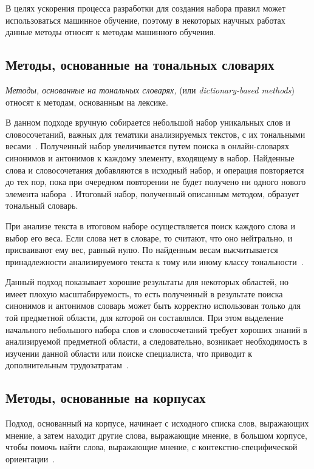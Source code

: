 В целях ускорения процесса разработки для создания набора правил может
использоваться машинное обучение, поэтому в некоторых научных работах
\cite{article16}~\cite{article17} данные методы относят к методам машинного
обучения.

\subsection{Методы, основанные на тональных словарях}

\textit{Методы, основанные на тональных словарях,} (или \textit{dictionary-based
methods}) относят к методам, основанным на лексике.

В данном подходе вручную собирается небольшой набор уникальных слов и
словосочетаний, важных для тематики анализируемых текстов, с их тональными
весами~\cite{article9}. Полученный набор увеличивается путем поиска в
онлайн-словарях синонимов и антонимов к каждому элементу, входящему в набор.
Найденные слова и словосочетания добавляются в исходный набор, и операция
повторяется до тех пор, пока при очередном повторении не будет получено
ни одного нового элемента набора~\cite{article4}. Итоговый набор,
полученный описанным методом, образует тональный словарь.

При анализе текста в итоговом наборе осуществляется поиск каждого слова и выбор
его веса. Если слова нет в словаре, то считают, что оно нейтрально, и
присваивают ему вес, равный нулю. По найденным весам высчитывается
принадлежности анализируемого текста к тому или иному классу
тональности~\cite{article9}.

Данный подход показывает хорошие результаты для некоторых областей, но
имеет плохую масштабируемость, то есть полученный в результате поиска
синонимов и антонимов словарь может быть корректно использован только для
той предметной области, для которой он составлялся. При этом выделение
начального небольшого набора слов и словосочетаний требует хороших
знаний в анализируемой предметной области, а следовательно, возникает
необходимость в изучении данной области или поиске специалиста, что приводит к
дополнительным трудозатратам~\cite{article9}.


\subsection{Методы, основанные на корпусах}

Подход, основанный на корпусе, начинает с исходного списка слов, выражающих
мнение, а затем находит другие слова, выражающие мнение, в большом корпусе,
чтобы помочь найти слова, выражающие мнение, с контекстно-специфической
ориентации~\cite{article2}.

